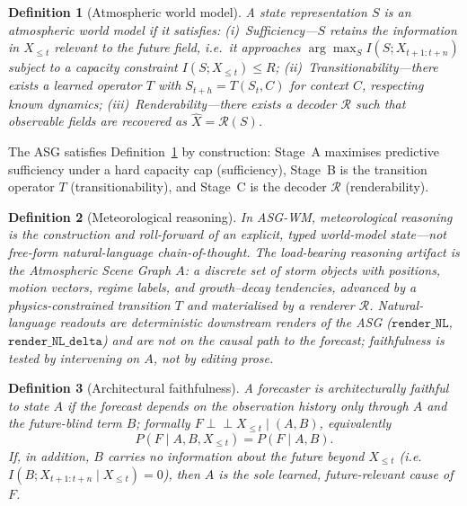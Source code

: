 \documentclass[fleqn,10pt]{wlscirep}
\newtheorem{definition}{Definition}
\begin{document}
\begin{definition}[Atmospheric world model]
\label{def:wm}
A state representation $S$ is an \emph{atmospheric world model} if it satisfies:
(i)~\emph{Sufficiency}---$S$ retains the information in $X_{\le t}$ relevant to the future field, i.e.\ it approaches $\arg\max_{S} I(S; X_{t+1:t+n})$ subject to a capacity constraint $I(S; X_{\le t}) \le R$;
(ii)~\emph{Transitionability}---there exists a learned operator $T$ with $S_{t+h}=T(S_t, C)$ for context $C$, respecting known dynamics;
(iii)~\emph{Renderability}---there exists a decoder $\mathcal{R}$ such that observable fields are recovered as $\hat{X}=\mathcal{R}(S)$.
\end{definition}

The ASG satisfies Definition~\ref{def:wm} by construction: Stage~A maximises predictive sufficiency under a hard capacity cap (sufficiency), Stage~B is the transition operator $T$ (transitionability), and Stage~C is the decoder $\mathcal{R}$ (renderability).

\begin{definition}[Meteorological reasoning]
\label{def:reasoning}
In ASG-WM, \emph{meteorological reasoning} is the construction and roll-forward of an explicit, typed world-model state---not free-form natural-language chain-of-thought.
The load-bearing reasoning artifact is the Atmospheric Scene Graph $A$: a discrete set of storm objects with positions, motion vectors, regime labels, and growth--decay tendencies, advanced by a physics-constrained transition $T$ and materialised by a renderer $\mathcal{R}$.
Natural-language readouts are deterministic downstream renders of the ASG ($\texttt{render\_NL}$, $\texttt{render\_NL\_delta}$) and are not on the causal path to the forecast; faithfulness is tested by intervening on $A$, not by editing prose.
\end{definition}

\begin{definition}[Architectural faithfulness]
\label{def:faith}
A forecaster is \emph{architecturally faithful} to state $A$ if the forecast depends on the observation history only through $A$ and the future-blind term $B$; formally $F \perp\!\!\!\perp X_{\le t} \mid (A,B)$, equivalently
\begin{equation}
P(F \mid A, B, X_{\le t}) = P(F \mid A, B).
\label{eq:faith}
\end{equation}
If, in addition, $B$ carries no information about the future beyond $X_{\le t}$ (i.e.\ $I(B; X_{t+1:t+n}\mid X_{\le t})=0$), then $A$ is the sole learned, future-relevant cause of $F$.
\end{definition}
\end{document}
